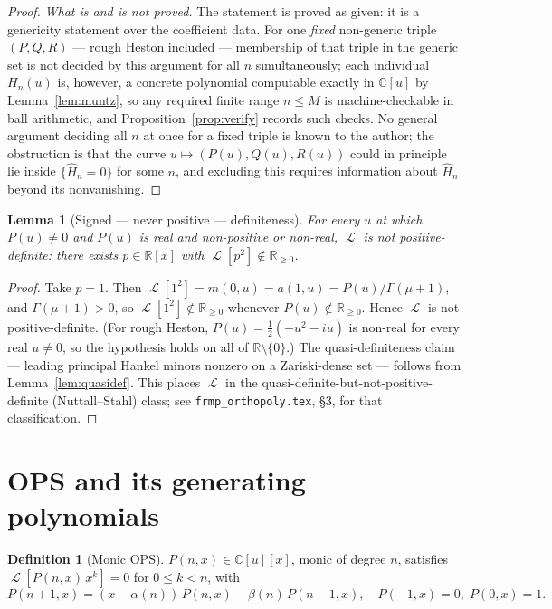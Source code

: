 \documentclass[11pt]{article}
\newtheorem{lemma}[theorem]{Lemma}
\theoremstyle{definition}
\newtheorem{definition}[theorem]{Definition}
\DeclareMathOperator{\Lop}{\mathcal{L}}
\begin{document}
\begin{proof}
\emph{What is and is not proved.} The statement is proved as given:
it is a genericity statement over the coefficient data. For one
\emph{fixed} non-generic triple $(P,Q,R)$ --- rough Heston included
--- membership of that triple in the generic set is not decided by
this argument for all $n$ simultaneously; each individual $H_{n}(u)$
is, however, a concrete polynomial computable exactly in
$\mathbb{C}[u]$ by Lemma~\ref{lem:muntz}, so any required finite range
$n \leq M$ is machine-checkable in ball arithmetic, and
Proposition~\ref{prop:verify} records such checks. No general
argument deciding all $n$ at once for a fixed triple is known to the
author; the obstruction is that the curve
$u \mapsto (P(u),Q(u),R(u))$ could in principle lie inside
$\{\widehat H_{n} = 0\}$ for some $n$, and excluding this requires
information about $\widehat H_{n}$ beyond its nonvanishing.
\end{proof}

\begin{lemma}[Signed --- never positive --- definiteness]\label{lem:signed}
For every $u$ at which $P(u) \neq 0$ and $P(u)$ is real and
non-positive or non-real, $\Lop$ is not positive-definite: there exists
$p \in \mathbb{R}[x]$ with $\Lop[p^{2}] \notin \mathbb{R}_{\geq 0}$.
\end{lemma}

\begin{proof}
Take $p = 1$. Then
$\Lop[1^{2}] = m(0,u) = a(1,u) = P(u)/\Gamma(\mu+1)$, and
$\Gamma(\mu+1) > 0$, so $\Lop[1^{2}] \notin \mathbb{R}_{\geq 0}$
whenever $P(u) \notin \mathbb{R}_{\geq 0}$. Hence $\Lop$ is not
positive-definite. (For rough Heston,
$P(u) = \tfrac{1}{2}(-u^{2}-iu)$ is non-real for every real
$u \neq 0$, so the hypothesis holds on all of
$\mathbb{R}\setminus\{0\}$.) The quasi-definiteness claim ---
leading principal Hankel minors nonzero on a Zariski-dense set ---
follows from Lemma~\ref{lem:quasidef}. This places $\Lop$ in the
quasi-definite-but-not-positive-definite (Nuttall--Stahl) class; see
\texttt{frmp\_orthopoly.tex}, \S3, for that classification.
\end{proof}

\section{OPS and its generating polynomials}

\begin{definition}[Monic OPS]\label{def:OPS}
$P(n,x) \in \mathbb{C}[u][x]$, monic of degree $n$, satisfies
$\Lop[P(n,x)\, x^{k}] = 0$ for $0\leq k < n$, with
\[
P(n+1,x) = (x - \alpha(n))\, P(n,x) - \beta(n)\, P(n-1,x),
\quad P(-1,x)=0,\; P(0,x)=1.
\]
\end{definition}
\end{document}
